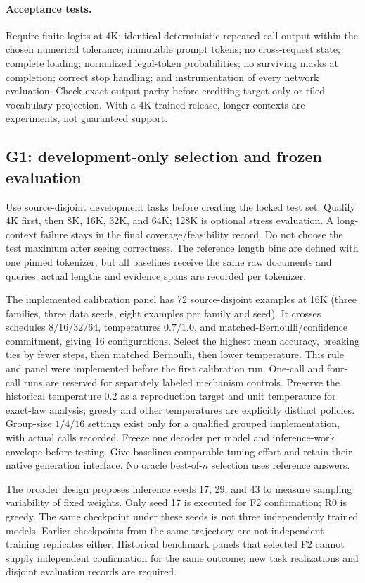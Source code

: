 \documentclass{article}
\theoremstyle{remark}\newtheorem{remark}[theorem]{Remark}
\begin{document}
\paragraph{Acceptance tests.}
Require finite logits at 4K; identical deterministic repeated-call output within the chosen numerical tolerance; immutable prompt tokens; no cross-request state; complete loading; normalized legal-token probabilities; no surviving masks at completion; correct stop handling; and instrumentation of every network evaluation. Check exact output parity before crediting target-only or tiled vocabulary projection. With a 4K-trained release, longer contexts are experiments, not guaranteed support.

\subsection{G1: development-only selection and frozen evaluation}
Use source-disjoint development tasks before creating the locked test set. Qualify 4K first, then 8K, 16K, 32K, and 64K; 128K is optional stress evaluation. A long-context failure stays in the final coverage/feasibility record. Do not choose the test maximum after seeing correctness. The reference length bins are defined with one pinned tokenizer, but all baselines receive the same raw documents and queries; actual lengths and evidence spans are recorded per tokenizer.

The implemented calibration panel has 72 source-disjoint examples at 16K (three families, three data seeds, eight examples per family and seed). It crosses schedules $8/16/32/64$, temperatures $0.7/1.0$, and matched-Bernoulli/confidence commitment, giving 16 configurations. Select the highest mean accuracy, breaking ties by fewer steps, then matched Bernoulli, then lower temperature. This rule and panel were implemented before the first calibration run. One-call and four-call runs are reserved for separately labeled mechanism controls. Preserve the historical temperature 0.2 as a reproduction target and unit temperature for exact-law analysis; greedy and other temperatures are explicitly distinct policies. Group-size $1/4/16$ settings exist only for a qualified grouped implementation, with actual calls recorded. Freeze one decoder per model and inference-work envelope before testing. Give baselines comparable tuning effort and retain their native generation interface. No oracle best-of-$n$ selection uses reference answers.

The broader design proposes inference seeds 17, 29, and 43 to measure sampling variability of fixed weights. Only seed 17 is executed for F2 confirmation; R0 is greedy. The same checkpoint under these seeds is not three independently trained models. Earlier checkpoints from the same trajectory are not independent training replicates either. Historical benchmark panels that selected F2 cannot supply independent confirmation for the same outcome; new task realizations and disjoint evaluation records are required.
\end{document}
